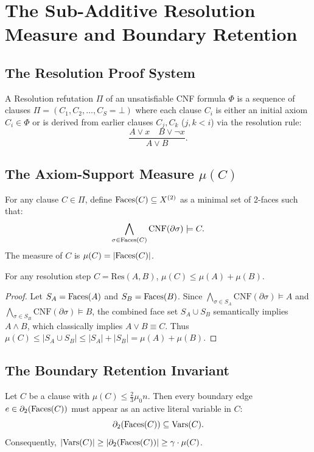 \chapter{The Sub-Additive Resolution Measure and Boundary Retention}

\section{The Resolution Proof System}
A Resolution refutation $\Pi$ of an unsatisfiable CNF formula $\Phi$ is a sequence of clauses $\Pi = (C_1, C_2, \dots, C_S = \bot)$ where each clause $C_i$ is either an initial axiom $C_i \in \Phi$ or is derived from earlier clauses $C_j, C_k$ ($j, k < i$) via the resolution rule:
\[
\frac{A \lor x \quad B \lor \neg x}{A \lor B}.
\]

\section{The Axiom-Support Measure $\mu(C)$}
\begin{definition}
For any clause $C \in \Pi$, define $\mathrm{Faces}(C) \subseteq X^{(2)}$ as a minimal set of 2-faces such that:
\[
\bigwedge_{\sigma \in \mathrm{Faces}(C)} \mathrm{CNF}(\partial \sigma) \models C.
\]
The measure of $C$ is $\mu(C) = |\mathrm{Faces}(C)|$.
\end{definition}

\begin{lemma}
For any resolution step $C = \mathrm{Res}(A, B)$, $\mu(C) \le \mu(A) + \mu(B)$.
\end{lemma}

\begin{proof}
Let $S_A = \mathrm{Faces}(A)$ and $S_B = \mathrm{Faces}(B)$. 
Since $\bigwedge_{\sigma \in S_A} \mathrm{CNF}(\partial \sigma) \models A$ and $\bigwedge_{\sigma \in S_B} \mathrm{CNF}(\partial \sigma) \models B$, the combined face set $S_A \cup S_B$ semantically implies $A \land B$, which classically implies $A \lor B \equiv C$. 
Thus $\mu(C) \le |S_A \cup S_B| \le |S_A| + |S_B| = \mu(A) + \mu(B)$.
\end{proof}

\section{The Boundary Retention Invariant}
\begin{theorem}
Let $C$ be a clause with $\mu(C) \le \frac{2}{3}\mu_0 n$. 
Then every boundary edge $e \in \partial_2(\mathrm{Faces}(C))$ must appear as an active literal variable in $C$:
\[
\partial_2(\mathrm{Faces}(C)) \subseteq \mathrm{Vars}(C).
\]
Consequently, $|\mathrm{Vars}(C)| \ge |\partial_2(\mathrm{Faces}(C))| \ge \gamma \cdot \mu(C)$.
\end{theorem}

